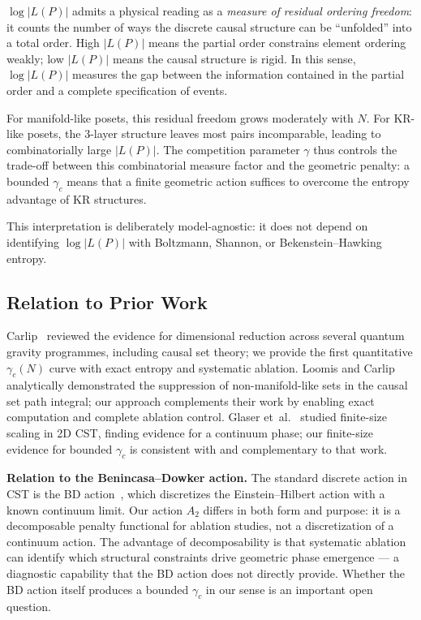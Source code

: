 \documentclass[11pt,a4paper]{article}
\begin{document}
$\log|L(P)|$ admits a physical reading as a \emph{measure of residual ordering
freedom}: it counts the number of ways the discrete causal structure can be
``unfolded'' into a total order. High $|L(P)|$ means the partial order
constrains element ordering weakly; low $|L(P)|$ means the causal structure is
rigid. In this sense, $\log|L(P)|$ measures the gap between the information
contained in the partial order and a complete specification of events.

For manifold-like posets, this residual freedom grows moderately with $N$. For
KR-like posets, the 3-layer structure leaves most pairs incomparable, leading to
combinatorially large $|L(P)|$. The competition parameter $\gamma$ thus
controls the trade-off between this combinatorial measure factor and the
geometric penalty: a bounded $\gamma_c$ means that a finite geometric action
suffices to overcome the entropy advantage of KR structures.

This interpretation is deliberately model-agnostic: it does not depend on
identifying $\log|L(P)|$ with Boltzmann, Shannon, or Bekenstein--Hawking
entropy.

\subsection{Relation to Prior Work}

Carlip~\cite{carlip2017} reviewed the evidence for dimensional reduction across several quantum gravity programmes, including causal set theory; we provide the first quantitative $\gamma_c(N)$ curve with exact entropy and systematic ablation. Loomis and Carlip~\cite{loomis2018} analytically demonstrated the suppression of non-manifold-like sets in the causal set path integral; our approach complements their work by enabling exact computation and complete ablation control. Glaser et~al.~\cite{glaser2018} studied finite-size scaling in 2D CST, finding evidence for a continuum phase; our finite-size evidence for bounded $\gamma_c$ is consistent with and complementary to that work.

\textbf{Relation to the Benincasa--Dowker action.} The standard discrete action in CST is the BD action~\cite{benincasa2010,benincasa2011}, which discretizes the Einstein--Hilbert action with a known continuum limit. Our action $A_2$ differs in both form and purpose: it is a decomposable penalty functional for ablation studies, not a discretization of a continuum action. The advantage of decomposability is that systematic ablation can identify which structural constraints drive geometric phase emergence --- a diagnostic capability that the BD action does not directly provide. Whether the BD action itself produces a bounded $\gamma_c$ in our sense is an important open question.
\end{document}
